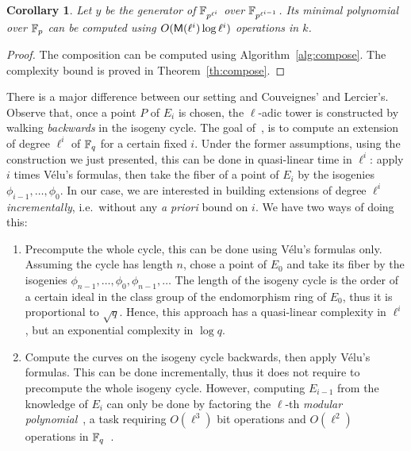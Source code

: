 \documentclass{sig-alternate}
\newtheorem{corollary}[definition]{Corollary}
\begin{document}
\begin{corollary}
  \sloppy
  Let $y$ be the generator of $\mathbb{F}_{p^{\ell^i}}$ over
  $\mathbb{F}_{p^{\ell^{i-1}}}$. Its minimal polynomial over $\mathbb{F}_p$ can be
  computed using $O(\mathsf{M}(\ell^i)\log\ell^i)$ operations in $k$.
\end{corollary}
\begin{proof}
  The composition can be computed using
  Algorithm~\ref{alg:compose}. The complexity bound is proved in
  Theorem~\ref{th:compose}.
\end{proof}

\begin{remark}
  \label{rk:cycle}
  There is a major difference between our setting and Couveignes' and
  Lercier's. Observe that, once a point $P$ of $E_i$ is chosen, the
  $\ell$-adic tower is constructed by walking \emph{backwards} in the
  isogeny cycle. The goal of~\cite{couveignes+lercier11}, is to
  compute an extension of degree $\ell^i$ of $\mathbb{F}_q$ for a certain
  fixed $i$. Under the former assumptions, using the construction we
  just presented, this can be done in quasi-linear time in $\ell^i$:
  apply $i$ times Vélu's formulas, then take the fiber of a point of
  $E_i$ by the isogenies $\phi_{i-1}, \ldots, \phi_0$. In our case, we
  are interested in building extensions of degree $\ell^i$
  \emph{incrementally}, i.e.\ without any \emph{a priori} bound on
  $i$. We have two ways of doing this:
  \begin{enumerate}
  \item Precompute the whole cycle, this can be done using Vélu's
    formulas only. Assuming the cycle has length $n$, chose a point of
    $E_0$ and take its fiber by the isogenies $\phi_{n-1}, \ldots,
    \phi_0, \phi_{n-1}, \ldots$ The length of the isogeny cycle is the
    order of a certain ideal in the class group of the endomorphism
    ring of $E_0$, thus it is proportional to $\sqrt{q}$. Hence, this
    approach has a quasi-linear complexity in $\ell^i$, but an
    exponential complexity in $\log q$.
  \item Compute the curves on the isogeny cycle backwards, then apply
    Vélu's formulas. This can be done incrementally, thus it does not
    require to precompute the whole isogeny cycle. However, computing
    $E_{i-1}$ from the knowledge of $E_i$ can only be done by
    factoring the $\ell$-th \emph{modular polynomial}~\cite{schoof95},
    a task requiring $O(\ell^3)$ bit operations and $O(\ell^2)$
    operations in $\mathbb{F}_q$~\cite{sutherland10:modpol}.
  \end{enumerate}
\end{remark}
\end{document}
